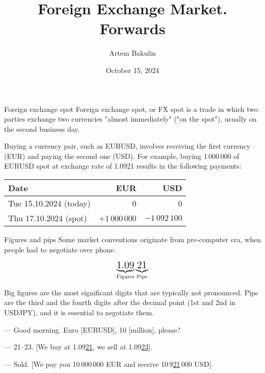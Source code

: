 \documentclass{beamer}
\title{Foreign Exchange Market. Forwards}
\author{Artem Bakulin}
\date{October 15, 2024}
\begin{document}
\begin{frame}
\titlepage
\end{frame}



\begin{frame}{Foreign exchange spot}
\justify
\alert{Foreign exchange spot, or FX spot} is a trade in which two parties exchange two currencies "almost immediately" ("on the spot"), usually on the second business day.

\justify
Buying a currency pair, such as EURUSD, involves receiving the first currency (EUR) and paying the second one (USD). For example, buying 1\,000\,000 of EURUSD spot at exchange rate of 1.0921 results in the following payments:
\justify

\centering
\begin{tabular}{l|r|r}
Date                          & EUR & USD \\ \hline
Tue 15.10.2024 (today)  & 0   & 0   \\
Thu 17.10.2024 (spot)     & +1\,000\,000 & $-1\,092\,100$
\end{tabular}
\end{frame}



\begin{frame}{Figures and pips}
\justify
Some market conventions originate from pre-computer era, when people had to negotiate
over phone.

\begin{align*}
\underbrace{\text{\Large 1.09}}_{\text{Figures}}\underbrace{\text{\Large 21}}_{\text{Pips}}
\end{align*}
\justify

\alert{Big figures} are  the most significant digits that are typically not pronounced. \alert{Pips} are the third and the fourth digits after the decimal point (1st and 2nd in USDJPY), and it is essential to negotiate them.

\justify
--- Good morning. Euro [EURUSD], 10 [million], please?

--- 21--23. [We buy at 1.09\underline{21}, we sell at 1.09\underline{23}].

--- Sold. [We pay you 10\,000\,000 EUR and receive 10\,9\underline{21}\,000 USD].
\end{frame}
\end{document}
